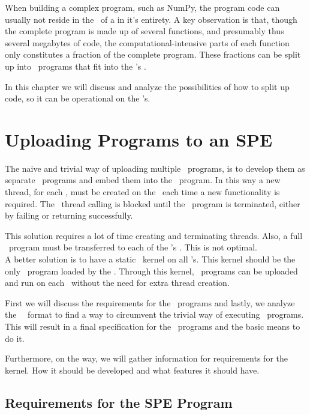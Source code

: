 When building a complex program, such as NumPy, the program code can
usually not reside in the \LS\ of a \SPE{} in it's entirety. A key
observation is that, though the complete program is made up of several
functions, and presumably thus several megabytes of code, the
computational-intensive parts of each function only constitutes a
fraction of the complete program. These fractions can be split up
into \SPE\ programs that fit into the \SPE{}'s \LS{}.

In this chapter we will discuss and analyze the possibilities of how
to split up code, so it can be operational on
the \SPE{}'s.

\section{Uploading Programs to an SPE}

The naive and trivial way of uploading multiple \SPE\ programs, is to
develop them as separate \SPE\ programs and embed them into the \PPE\
program. In this way a new thread, for each \SPE{}, must be
created on the \PPE\ each time a new functionality is required. The \PPE\ thread
calling \function{spe\_context\_run()} is blocked until the \SPE\
program is terminated, either by failing or returning successfully.

This solution requires a lot of time creating and terminating
threads. Also, a full \SPE\ program must be transferred to each of
the \SPE{}'s \LS{}. This is not optimal. \\

A better solution is to have a static \SPE\ kernel on
all \SPE{}'s. This kernel should be the only \SPE\ program loaded by
the \PPE{}. Through this kernel, \SPE\ programs can be uploaded and
run on each \SPE\ without the need for extra thread creation.

First we will discuss the requirements for the \SPE\ programs and
lastly, we analyze the \SPE\ \ELF\ format to find a way to circumvent
the trivial way of executing \SPE\ programs. This will result in a final
specification for the \SPE\ programs and the basic means to do it.

Furthermore, on the way, we will gather information for requirements
for the kernel. How it should be developed and what features it should
have.

\subsection{Requirements for the SPE Program}

